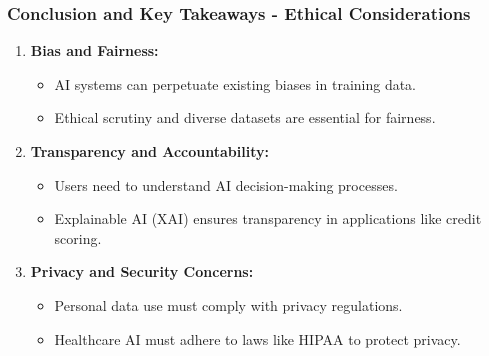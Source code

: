 \documentclass{beamer}
\begin{document}
\begin{frame}[fragile]
    \frametitle{Conclusion and Key Takeaways - Ethical Considerations}
    \begin{enumerate}
        \item \textbf{Bias and Fairness:}
        \begin{itemize}
            \item AI systems can perpetuate existing biases in training data.
            \item Ethical scrutiny and diverse datasets are essential for fairness.
        \end{itemize}

        \item \textbf{Transparency and Accountability:}
        \begin{itemize}
            \item Users need to understand AI decision-making processes.
            \item Explainable AI (XAI) ensures transparency in applications like credit scoring.
        \end{itemize}

        \item \textbf{Privacy and Security Concerns:}
        \begin{itemize}
            \item Personal data use must comply with privacy regulations.
            \item Healthcare AI must adhere to laws like HIPAA to protect privacy.
        \end{itemize}
    \end{enumerate}
\end{frame}
\end{document}
